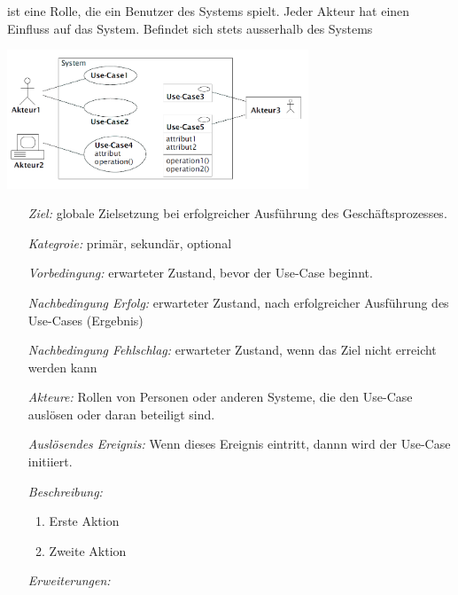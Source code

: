 	\begin{description}[leftmargin=2cm]
		\item[Akteur]
      \parbox{6cm}{
        ist eine Rolle, die ein Benutzer des Systems spielt. Jeder Akteur hat einen 
        Einfluss auf das System. Befindet sich stets ausserhalb des Systems}
      \hspace{0.5cm}
      \parbox{9cm}{\includegraphics[width=9cm]{./bilder/UseCase_Notation.png}}
    \item[Schablone]
      \begin{itemize}[leftmargin=4cm]
        \item[\textit{Ziel:}]
          globale Zielsetzung bei erfolgreicher Ausführung des Geschäftsprozesses.
        \item[\textit{Kategroie:}]
          primär, sekundär, optional
        \item[\textit{Vorbedingung:}]
          erwarteter Zustand, bevor der Use-Case beginnt.
        \item[\textit{Nachbedingung Erfolg:}]
          erwarteter Zustand, nach erfolgreicher Ausführung des Use-Cases (Ergebnis)
        \item[\textit{Nachbedingung Fehlschlag:}]
          erwarteter Zustand, wenn das Ziel nicht erreicht werden kann
        \item[\textit{Akteure:}]
          Rollen von Personen oder anderen Systeme, die den Use-Case auslösen
          oder daran beteiligt sind.
        \item[\textit{Auslösendes Ereignis:}]
          Wenn dieses Ereignis eintritt, dannn wird der Use-Case initiiert.
        \item[\textit{Beschreibung:}]
          \begin{enumerate}[leftmargin=0.5cm]
            \item Erste Aktion
            \item Zweite Aktion
          \end{enumerate}
        \item[\textit{Erweiterungen:}]
          \begin{enumerate}[leftmargin=0.5cm]

\end{enumerate}
\end{itemize}
\end{description}
